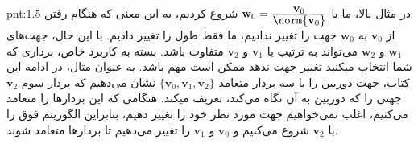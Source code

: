 {\begin{spacing}{1.5}
        \begin{point}{pnt:1.5}
            \Large
            در مثال بالا، ما با $\textbf{w}_{0}=\frac{\displaystyle\textbf{v}_{0}}{\displaystyle\norm{\textbf{v}_{0}}}$ شروع کردیم، به این معنی که هنگام رفتن از $\textbf{v}_{0}$ به $\textbf{w}_{0}$ جهت را تغییر ندادیم،
            ما فقط طول را تغییر دادیم.
            با این حال، جهت‌های $\textbf{w}_{1}$ و $\textbf{w}_{2}$ می‌تواند به ترتیب با $\textbf{v}_{1}$ و $\textbf{v}_{2}$ متفاوت باشد.
            بسته به کاربرد خاص، برداری که شما انتخاب میکنید تغییر جهت ندهد ممکن است مهم باشد.
            به عنوان مثال، در ادامه این کتاب، جهت دوربین را با سه بردار متعامد $\{\textbf{v}_{0},\textbf{v}_{1},\textbf{v}_{2}\}$ نشان می‌دهیم که بردار سوم $\textbf{v}_{2}$ جهتی را که دوربین به آن نگاه می‌کند، تعریف میکند.
            هنگامی که این بردارها را متعامد می‌کنیم، اغلب نمی‌خواهیم جهت مورد نظر خود را تغییر دهیم،
            بنابراین الگوریتم فوق را با $\textbf{v}_{2}$ شروع می‌کنیم و $\textbf{v}_{0}$ و $\textbf{v}_{1}$ را تغییر می‌دهیم تا بردارها متعامد شوند.
        \end{point}
    \end{spacing}
}


